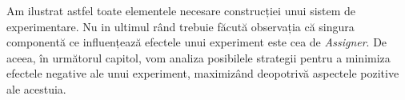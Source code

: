 Am ilustrat astfel toate elementele necesare construcției unui sistem de experimentare. Nu in ultimul rând trebuie făcută observația că singura componentă ce influențează efectele unui experiment este cea de \textit{Assigner}. De aceea, în următorul capitol, vom analiza posibilele strategii pentru a minimiza efectele negative ale unui experiment, maximizând deopotrivă aspectele pozitive ale acestuia.